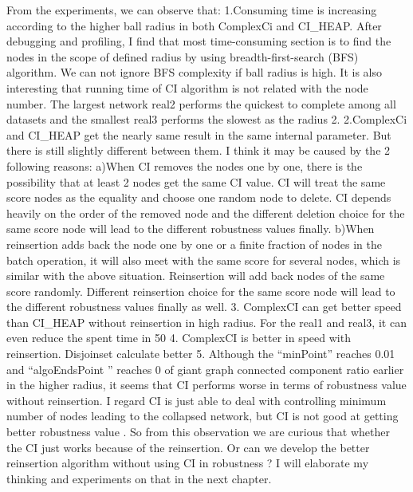 \documentclass{article}
\begin{document}
	From the experiments, we can observe that:
	1.Consuming time is increasing according to the higher ball radius in both ComplexCi and CI\_HEAP. After debugging and profiling, I find that most time-consuming section is to find the nodes in the scope of defined radius by using breadth-first-search (BFS) algorithm. We can not ignore BFS complexity if ball radius is high. It is also interesting that running time of CI algorithm is not related with the node number. The largest network real2 performs the quickest to complete among all datasets and the smallest real3 performs the slowest as the radius 2. 
	2.ComplexCi and CI\_HEAP get the nearly same result in the same internal parameter. But there is still slightly different between them. I think it may be caused by the 2 following reasons:
	a)When CI removes the nodes one by one, there is the possibility that at least 2 nodes get the same CI value. CI will treat the same score nodes as the equality and choose one random node to delete. CI depends heavily on the order of the removed node and the different deletion choice for the same score node will lead to the different robustness values finally. 
	b)When reinsertion adds back the node one by one or a finite fraction of nodes in the batch operation, it will also meet with the same score for several nodes, which is similar with the above situation. Reinsertion will add back nodes of the same score randomly. Different reinsertion choice for the same score node will lead to the different robustness values finally as well.
	3. ComplexCI can get better speed than CI\_HEAP without reinsertion in high radius. For the real1 and real3, it can even reduce the spent time in 50%
	4. ComplexCI is better in speed with reinsertion. Disjoinset calculate better 
	5. Although the “minPoint” reaches 0.01 and “algoEndsPoint ” reaches 0 of giant graph connected component ratio earlier in the higher radius, it seems that CI performs worse in terms of robustness value without reinsertion. I regard CI is just able to deal with controlling minimum number of nodes leading to the collapsed network, but CI is not good at getting better robustness value . So from this observation we are curious that whether the CI just works because of the reinsertion. Or can we develop the better reinsertion algorithm without using CI in robustness ? I will elaborate my thinking and experiments on that in the next chapter.	
\end{document}
